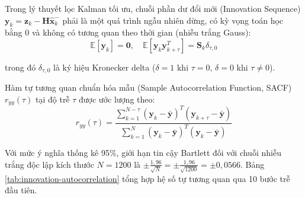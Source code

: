 \hspace{0.5cm} Trong lý thuyết lọc Kalman tối ưu, chuỗi phần dư đổi mới (Innovation Sequence) $\mathbf{y}_k = \mathbf{z}_k - \mathbf{H} \hat{\mathbf{x}}_k^-$ phải là một quá trình ngẫu nhiên dừng, có kỳ vọng toán học bằng 0 và không có tương quan theo thời gian (nhiễu trắng Gauss):
\begin{equation}
\mathbb{E}[\mathbf{y}_k] = \mathbf{0}, \quad \mathbb{E}[\mathbf{y}_k \mathbf{y}_{k+\tau}^T] = \mathbf{S}_k \delta_{\tau, 0}
\label{eq:innovation-whiteness}
\end{equation}

trong đó $\delta_{\tau, 0}$ là ký hiệu Kronecker delta ($\delta = 1$ khi $\tau = 0$, $\delta = 0$ khi $\tau \ne 0$).

Hàm tự tương quan chuẩn hóa mẫu (Sample Autocorrelation Function, SACF) $r_{yy}(\tau)$ tại độ trễ $\tau$ được ước lượng theo:
\begin{equation}
r_{yy}(\tau) = \frac{\sum_{k=1}^{N-\tau} (\mathbf{y}_k - \bar{\mathbf{y}})^T (\mathbf{y}_{k+\tau} - \bar{\mathbf{y}})}{\sum_{k=1}^{N} (\mathbf{y}_k - \bar{\mathbf{y}})^T (\mathbf{y}_k - \bar{\mathbf{y}})}
\label{eq:sacf-formula}
\end{equation}

Với mức ý nghĩa thống kê 95\%, giới hạn tin cậy Bartlett đối với chuỗi nhiễu trắng độc lập kích thước $N = 1200$ là $\pm \frac{1{,}96}{\sqrt{N}} = \pm \frac{1{,}96}{\sqrt{1200}} = \pm 0{,}0566$. Bảng \ref{tab:innovation-autocorrelation} tổng hợp hệ số tự tương quan qua 10 bước trễ đầu tiên.

